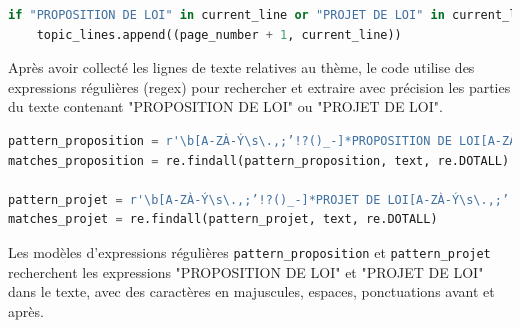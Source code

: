 \begin{lstlisting}[language=Python]
if "PROPOSITION DE LOI" in current_line or "PROJET DE LOI" in current_line:
    topic_lines.append((page_number + 1, current_line))
\end{lstlisting}

\newpage
Après avoir collecté les lignes de texte relatives au thème, le code utilise des expressions régulières (\gls{regex}) pour rechercher et extraire avec précision les parties du texte contenant "PROPOSITION DE LOI" ou "PROJET DE LOI".

\begin{lstlisting}[language=Python]
pattern_proposition = r'\b[A-ZÀ-Ý\s\.,;’!?()_-]*PROPOSITION DE LOI[A-ZÀ-Ý\s\.,;’!?()_-]*\b'
matches_proposition = re.findall(pattern_proposition, text, re.DOTALL)

pattern_projet = r'\b[A-ZÀ-Ý\s\.,;’!?()_-]*PROJET DE LOI[A-ZÀ-Ý\s\.,;’!?()_-]*\b'
matches_projet = re.findall(pattern_projet, text, re.DOTALL)
\end{lstlisting}
Les modèles d'expressions régulières \texttt{pattern\_proposition} et \texttt{pattern\_projet} recherchent les expressions "PROPOSITION DE LOI" et "PROJET DE LOI" dans le texte, avec des caractères en majuscules, espaces, ponctuations avant et après. 


